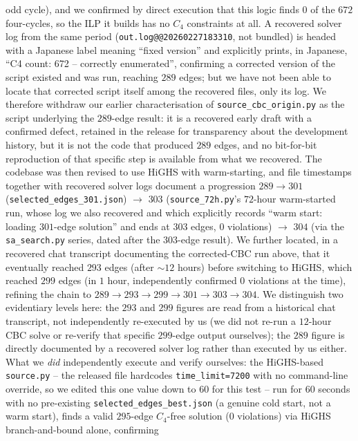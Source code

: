 \documentclass[12pt,a4paper]{article}
\theoremstyle{definition}
\begin{document}
odd cycle), and we confirmed by direct execution that this logic finds
$0$ of the $672$ four-cycles, so the ILP it builds has no $C_4$
constraints at all. A recovered solver log from the same period
(\texttt{out.log@@20260227183310}, not bundled) is headed with a
Japanese label meaning ``fixed version'' and explicitly prints, in
Japanese, ``C4 count: 672 -- correctly enumerated'', confirming a
corrected version of the script existed and was run, reaching $289$
edges; but we have not been able to locate that corrected script
itself among the recovered files, only its log. We therefore withdraw
our earlier characterisation of \texttt{source\_cbc\_origin.py} as
the script underlying the $289$-edge result: it is a recovered early
draft with a confirmed defect, retained in the release for
transparency about the development history, but it is not the code
that produced $289$ edges, and no bit-for-bit reproduction of that
specific step is available from what we recovered. The codebase was then revised to use HiGHS
with warm-starting, and file timestamps together with recovered solver
logs document a progression $289\to301$
(\texttt{selected\_edges\_301.json}) $\to$ $303$
(\texttt{source\_72h.py}'s $72$-hour warm-started run, whose log we
also recovered and which explicitly records ``warm start: loading
$301$-edge solution'' and ends at $303$ edges, $0$ violations) $\to$
$304$ (via the \texttt{sa\_search.py} series, dated after the $303$-edge
result). We further located, in a recovered chat transcript
documenting the corrected-CBC run above, that it eventually reached $293$ edges
(after $\sim12$ hours) before switching to HiGHS, which reached $299$
edges (in $1$ hour, independently confirmed $0$ violations at the
time), refining the chain to
$289\to293\to299\to301\to303\to304$. We distinguish two evidentiary
levels here: the $293$ and $299$ figures are read from a historical
chat transcript, not independently re-executed by us (we did not
re-run a $12$-hour CBC solve or re-verify that specific $299$-edge
output ourselves); the $289$ figure is directly documented by a
recovered solver log rather than executed by us either. What we
\emph{did} independently execute and verify ourselves: the HiGHS-based \texttt{source.py} --
the released file hardcodes \texttt{time\_limit=7200} with no
command-line override, so we edited this one value down to $60$ for
this test -- run for $60$ seconds
with no pre-existing \texttt{selected\_edges\_best.json} (a genuine
cold start, not a warm start), finds a valid $295$-edge $C_4$-free
solution ($0$ violations) via HiGHS branch-and-bound alone, confirming
\end{document}
